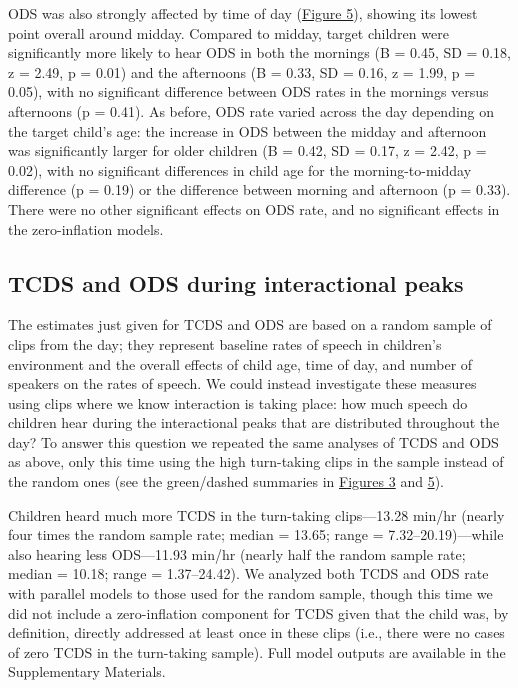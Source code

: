 \documentclass[floatsintext,man]{apa6}
\theoremstyle{definition}
\theoremstyle{definition}
\theoremstyle{definition}
\theoremstyle{remark}
\begin{document}
ODS was also strongly affected by time of day
(\protect\hyperlink{fig5}{Figure 5}), showing its lowest point overall
around midday. Compared to midday, target children were significantly
more likely to hear ODS in both the mornings (B = 0.45, SD = 0.18, z =
2.49, p = 0.01) and the afternoons (B = 0.33, SD = 0.16, z = 1.99, p =
0.05), with no significant difference between ODS rates in the mornings
versus afternoons (p = 0.41). As before, ODS rate varied across the day
depending on the target child's age: the increase in ODS between the
midday and afternoon was significantly larger for older children (B =
0.42, SD = 0.17, z = 2.42, p = 0.02), with no significant differences in
child age for the morning-to-midday difference (p = 0.19) or the
difference between morning and afternoon (p = 0.33). There were no other
significant effects on ODS rate, and no significant effects in the
zero-inflation models.

\subsection{TCDS and ODS during interactional
peaks}\label{tcds-and-ods-during-interactional-peaks}

The estimates just given for TCDS and ODS are based on a random sample
of clips from the day; they represent baseline rates of speech in
children's environment and the overall effects of child age, time of
day, and number of speakers on the rates of speech. We could instead
investigate these measures using clips where we know interaction is
taking place: how much speech do children hear during the interactional
peaks that are distributed throughout the day? To answer this question
we repeated the same analyses of TCDS and ODS as above, only this time
using the high turn-taking clips in the sample instead of the random
ones (see the green/dashed summaries in \protect\hyperlink{fig3}{Figures
3} and \protect\hyperlink{fig5}{5}).

Children heard much more TCDS in the turn-taking clips---13.28 min/hr
(nearly four times the random sample rate; median = 13.65; range =
7.32--20.19)---while also hearing less ODS---11.93 min/hr (nearly half
the random sample rate; median = 10.18; range = 1.37--24.42). We
analyzed both TCDS and ODS rate with parallel models to those used for
the random sample, though this time we did not include a zero-inflation
component for TCDS given that the child was, by definition, directly
addressed at least once in these clips (i.e., there were no cases of
zero TCDS in the turn-taking sample). Full model outputs are available
in the Supplementary Materials.
\end{document}
